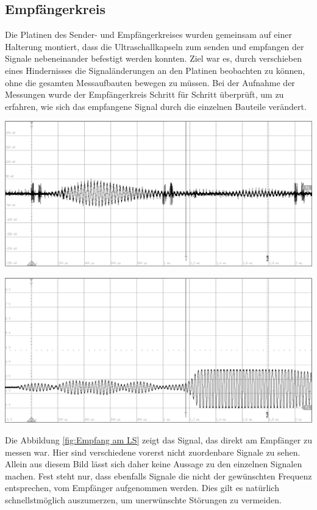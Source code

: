 \subsection{Empfängerkreis}
Die Platinen des Sender- und Empfängerkreises wurden gemeinsam auf einer Halterung montiert, dass die Ultraschallkapseln zum senden und empfangen der Signale nebeneinander befestigt werden konnten. Ziel war es, durch verschieben eines Hindernisses die Signaländerungen an den Platinen beobachten zu können, ohne die gesamten Messaufbauten bewegen zu müssen. Bei der Aufnahme der Messungen wurde der Empfängerkreis Schritt für Schritt überprüft, um zu erfahren, wie sich das empfangene Signal durch die einzelnen Bauteile verändert.\\
\begin{minipage}{0.5\textwidth}
\includegraphics[width=1\textwidth%
]{Abbildungen/MessungenP1/Signal-Empfang.png}
\label{fig:Empfang am LS}
\end{minipage}
\begin{minipage}{0.5\textwidth}
\includegraphics[width=1\textwidth%
]{Abbildungen/MessungenP1/Signal-nach-Verstarkung.png}
\label{fig:Verstaerkung}
\end{minipage}
Die Abbildung \ref{fig:Empfang am LS} zeigt das Signal, das direkt am Empfänger zu messen war. Hier sind verschiedene vorerst nicht zuordenbare Signale zu sehen. Allein aus diesem Bild lässt sich daher keine Aussage zu den einzelnen Signalen machen. Fest steht nur, dass ebenfalls Signale die nicht der gewünschten Frequenz entsprechen, vom Empfänger aufgenommen werden. Dies gilt es natürlich schnellstmöglich auszumerzen, um unerwünschte Störungen zu vermeiden.
